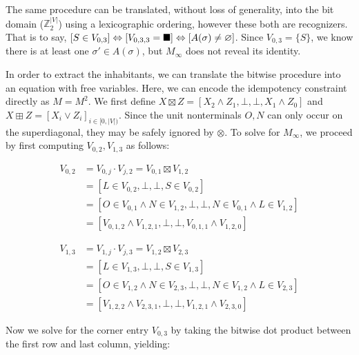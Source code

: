 \documentclass[sigplan,review,anonymous,acmsmall]{acmart}\settopmatter{printfolios=false,printccs=false,printacmref=false}
\begin{document}
  The same procedure can be translated, without loss of generality, into the bit domain ($\mathbb{Z}_2^{|V|}$) using a lexicographic ordering, however these both are recognizers. That is to say, $[S\in V_{0, 3}]\Leftrightarrow [V_{0, 3, 3}=\blacksquare] \Leftrightarrow [A(\sigma) \neq \varnothing]$. Since $V_{0, 3} = \{S\}$, we know there is at least one $\sigma' \in A(\sigma)$, but $M_\infty$ does not reveal its identity.


  In order to extract the inhabitants, we can translate the bitwise procedure into an equation with free variables. Here, we can encode the idempotency constraint directly as $M = M^2$. We first define $X \boxtimes Z = [X_2 \land Z_1, \bot, \bot, X_1 \land Z_0]$ and $X \boxplus Z = [X_i \lor Z_i]_{i \in [0, |V|)}$. Since the unit nonterminals $O, N$ can only occur on the superdiagonal, they may be safely ignored by $\otimes$. To solve for $M_\infty$, we proceed by first computing $V_{0, 2}, V_{1, 3}$ as follows:

  \begin{align}
    V_{0, 2} &= V_{0, j} \cdot V_{j, 2} = V_{0, 1} \boxtimes V_{1, 2}\\
    &= [L \in V_{0, 2}, \bot, \bot, S \in V_{0, 2}]\\
    &= [O \in V_{0, 1} \land N \in V_{1, 2}, \bot, \bot, N \in V_{0, 1} \land L \in V_{1, 2}]\\
    &= [V_{0, 1, 2} \land V_{1, 2, 1}, \bot, \bot, V_{0, 1, 1} \land V_{1, 2, 0}]
  \end{align}

  \begin{align}
    V_{1, 3} &= V_{1, j} \cdot V_{j, 3} = V_{1, 2} \boxtimes V_{2, 3}\\
    &= [L \in V_{1, 3}, \bot, \bot, S \in V_{1, 3}]\\
    &= [O \in V_{1, 2} \land N \in V_{2, 3}, \bot, \bot, N \in V_{1, 2} \land L \in V_{2, 3}]\\
    &= [V_{1, 2, 2} \land V_{2, 3, 1}, \bot, \bot, V_{1, 2, 1} \land V_{2, 3, 0}]
  \end{align}

  Now we solve for the corner entry $V_{0, 3}$ by taking the bitwise dot product between the first row and last column, yielding:
\end{document}
